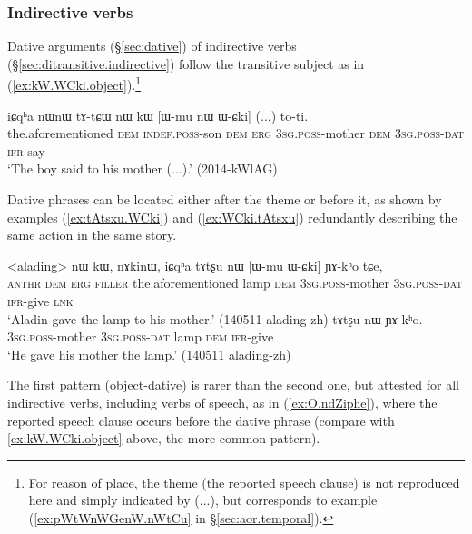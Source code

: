 \subsubsection{Indirective verbs} \label{sec:indirective.word.order}
 
Dative arguments (§\ref{sec:dative}) of indirective verbs (§\ref{sec:ditransitive.indirective}) follow the transitive subject as in (\ref{ex:kW.WCki.object}).\footnote{For reason of place, the theme (the reported speech clause) is not reproduced here and simply indicated by (...), but corresponds to example (\ref{ex:pWtWnWGenW.nWtCu} in §\ref{sec:aor.temporal}). }

\begin{exe}
\ex \label{ex:kW.WCki.object}
\gll  iɕqʰa nɯnɯ tɤ-tɕɯ nɯ kɯ [ɯ-mu nɯ ɯ-ɕki] (...) to-ti. \\
the.aforementioned \textsc{dem} \textsc{indef}.\textsc{poss}-son \textsc{dem} \textsc{erg} \textsc{3sg}.\textsc{poss}-mother \textsc{dem} \textsc{3sg}.\textsc{poss}-\textsc{dat} {  } \textsc{ifr}-say \\
\glt `The boy said to his mother (...).' (2014-kWlAG)
\end{exe}

Dative phrases can be located either after the theme or before it, as shown by examples (\ref{ex:tAtsxu.WCki}) and (\ref{ex:WCki.tAtsxu}) redundantly describing the same action in the same story. 

\begin{exe}
\ex 
\begin{xlist}
\ex \label{ex:tAtsxu.WCki}
\gll  <alading> nɯ kɯ, nɤkinɯ, iɕqʰa tɤtʂu nɯ [ɯ-mu ɯ-ɕki] ɲɤ-kʰo tɕe, \\
\textsc{anthr} \textsc{dem} \textsc{erg} \textsc{filler} the.aforementioned lamp \textsc{dem} \textsc{3sg}.\textsc{poss}-mother  \textsc{3sg}.\textsc{poss}-\textsc{dat} \textsc{ifr}-give \textsc{lnk} \\
\glt `Aladin gave the lamp to his mother.' (140511 alading-zh)
\ex \label{ex:WCki.tAtsxu}
\gll  [ɯ-mu ɯ-ɕki] tɤtʂu nɯ ɲɤ-kʰo. \\
\textsc{3sg}.\textsc{poss}-mother \textsc{3sg}.\textsc{poss}-\textsc{dat} lamp \textsc{dem} \textsc{ifr}-give \\
\glt `He gave his mother the lamp.' (140511 alading-zh)
\end{xlist}
\end{exe}

The first pattern (object-dative) is rarer than the second one, but attested for all indirective verbs, including verbs of speech, as in (\ref{ex:O.ndZiphe}), where the reported speech clause occurs before the dative phrase (compare with \ref{ex:kW.WCki.object} above, the more common pattern).

